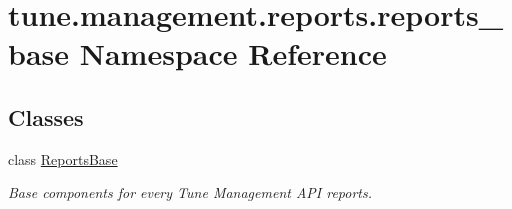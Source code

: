 \hypertarget{namespacetune_1_1management_1_1reports_1_1reports__base}{\section{tune.\-management.\-reports.\-reports\-\_\-base Namespace Reference}
\label{namespacetune_1_1management_1_1reports_1_1reports__base}
}
\subsection*{Classes}
\begin{DoxyCompactItemize}
\item 
class \hyperlink{classtune_1_1management_1_1reports_1_1reports__base_1_1ReportsBase}{Reports\-Base}
\begin{DoxyCompactList}\small\item\em Base components for every Tune Management A\-P\-I reports. \end{DoxyCompactList}\end{DoxyCompactItemize}
